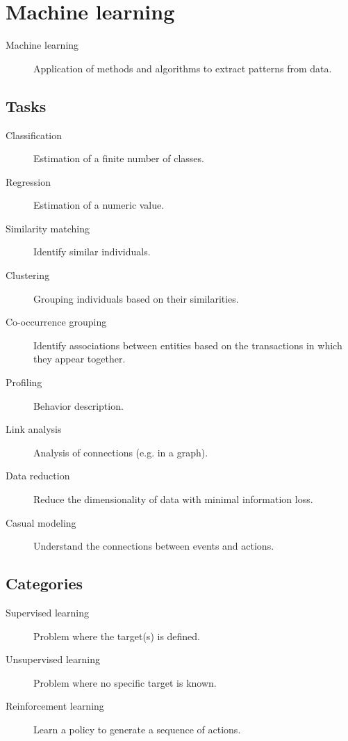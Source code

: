 \chapter{Machine learning}

\begin{description}
    \item[Machine learning] 
        Application of methods and algorithms to extract patterns from data.
\end{description}

\section{Tasks}
\begin{description}
    \item[Classification] Estimation of a finite number of classes.
    \item[Regression] Estimation of a numeric value.
    \item[Similarity matching] Identify similar individuals.
    \item[Clustering] Grouping individuals based on their similarities.
    \item[Co-occurrence grouping] Identify associations between entities based on the transactions in which they appear together.
    \item[Profiling] Behavior description.
    \item[Link analysis] Analysis of connections (e.g. in a graph).
    \item[Data reduction] Reduce the dimensionality of data with minimal information loss.
    \item[Casual modeling] Understand the connections between events and actions.  
\end{description}


\section{Categories}
\begin{description}
    \item[Supervised learning] 
        Problem where the target(s) is defined.
    \item[Unsupervised learning] 
        Problem where no specific target is known.
    \item[Reinforcement learning] 
        Learn a policy to generate a sequence of actions.
\end{description}



